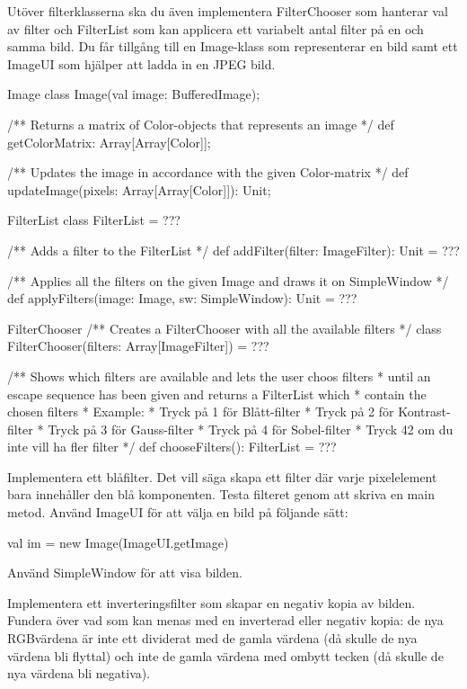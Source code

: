 Utöver filterklasserna ska du även implementera FilterChooser som hanterar val av filter och FilterList som kan applicera ett variabelt antal filter på en och samma bild. Du får tillgång till en Image-klass som representerar en bild samt ett ImageUI som hjälper att ladda in en JPEG bild.

\begin{ScalaSpec}{Image}
class Image(val image: BufferedImage);

/** Returns a matrix of Color-objects that represents an image */
def getColorMatrix: Array[Array[Color]];

/** Updates the image in accordance with the given Color-matrix */
def updateImage(pixels: Array[Array[Color]]): Unit;
\end{ScalaSpec}

\begin{ScalaSpec}{FilterList}
class FilterList = ???

/** Adds a filter to the FilterList */
def addFilter(filter: ImageFilter): Unit = ???
  
/** Applies all the filters on the given Image and draws it on SimpleWindow */
def applyFilters(image: Image, sw: SimpleWindow): Unit = ???
\end{ScalaSpec}

\begin{ScalaSpec}{FilterChooser}
/** Creates a FilterChooser with all the available filters */
class FilterChooser(filters: Array[ImageFilter]) = ???
  
/** Shows which filters are available and lets the user choos filters
*   until an escape sequence has been given and returns a FilterList which
*   contain the chosen filters
*   Example: 
*   Tryck på 1 för Blått-filter
*   Tryck på 2 för Kontrast-filter
*   Tryck på 3 för Gauss-filter
*   Tryck på 4 för Sobel-filter
*   Tryck 42 om du inte vill ha fler filter
*/
def chooseFilters(): FilterList = ???
\end{ScalaSpec}


\Task Implementera ett blåfilter. Det vill säga skapa ett filter där varje pixelelement bara innehåller den blå komponenten. Testa filteret genom att skriva en main metod. Använd ImageUI för att välja en bild på följande sätt:
\begin{Code}
val im = new Image(ImageUI.getImage)
\end{Code}
Använd SimpleWindow för att visa bilden.

\Task Implementera ett inverteringsfilter som skapar en negativ kopia av bilden. 
Fundera över vad som kan menas med en inverterad eller negativ kopia: de nya RGBvärdena är inte ett dividerat med de gamla värdena (då skulle de nya värdena bli flyttal) och inte de gamla värdena med ombytt tecken (då skulle de nya värdena bli negativa).

